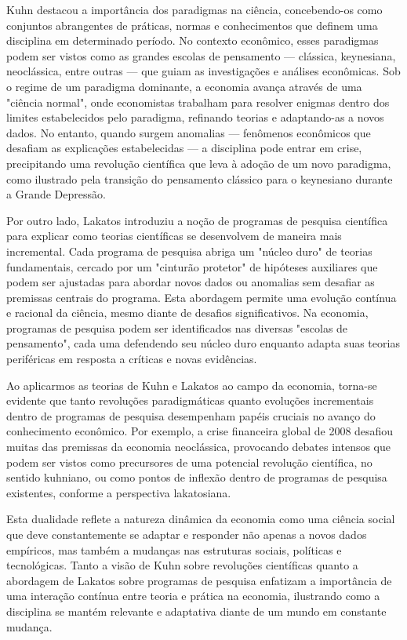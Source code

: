 \documentclass[12pt]{article}
\begin{document}
Kuhn destacou a importância dos paradigmas na ciência, concebendo-os como conjuntos abrangentes de práticas, normas e conhecimentos que definem uma disciplina em determinado período. No contexto econômico, esses paradigmas podem ser vistos como as grandes escolas de pensamento — clássica, keynesiana, neoclássica, entre outras — que guiam as investigações e análises econômicas. Sob o regime de um paradigma dominante, a economia avança através de uma "ciência normal", onde economistas trabalham para resolver enigmas dentro dos limites estabelecidos pelo paradigma, refinando teorias e adaptando-as a novos dados. No entanto, quando surgem anomalias — fenômenos econômicos que desafiam as explicações estabelecidas — a disciplina pode entrar em crise, precipitando uma revolução científica que leva à adoção de um novo paradigma, como ilustrado pela transição do pensamento clássico para o keynesiano durante a Grande Depressão.

Por outro lado, Lakatos introduziu a noção de programas de pesquisa científica para explicar como teorias científicas se desenvolvem de maneira mais incremental. Cada programa de pesquisa abriga um "núcleo duro" de teorias fundamentais, cercado por um "cinturão protetor" de hipóteses auxiliares que podem ser ajustadas para abordar novos dados ou anomalias sem desafiar as premissas centrais do programa. Esta abordagem permite uma evolução contínua e racional da ciência, mesmo diante de desafios significativos. Na economia, programas de pesquisa podem ser identificados nas diversas "escolas de pensamento", cada uma defendendo seu núcleo duro enquanto adapta suas teorias periféricas em resposta a críticas e novas evidências.

Ao aplicarmos as teorias de Kuhn e Lakatos ao campo da economia, torna-se evidente que tanto revoluções paradigmáticas quanto evoluções incrementais dentro de programas de pesquisa desempenham papéis cruciais no avanço do conhecimento econômico. Por exemplo, a crise financeira global de 2008 desafiou muitas das premissas da economia neoclássica, provocando debates intensos que podem ser vistos como precursores de uma potencial revolução científica, no sentido kuhniano, ou como pontos de inflexão dentro de programas de pesquisa existentes, conforme a perspectiva lakatosiana.

Esta dualidade reflete a natureza dinâmica da economia como uma ciência social que deve constantemente se adaptar e responder não apenas a novos dados empíricos, mas também a mudanças nas estruturas sociais, políticas e tecnológicas. Tanto a visão de Kuhn sobre revoluções científicas quanto a abordagem de Lakatos sobre programas de pesquisa enfatizam a importância de uma interação contínua entre teoria e prática na economia, ilustrando como a disciplina se mantém relevante e adaptativa diante de um mundo em constante mudança.
\end{document}
